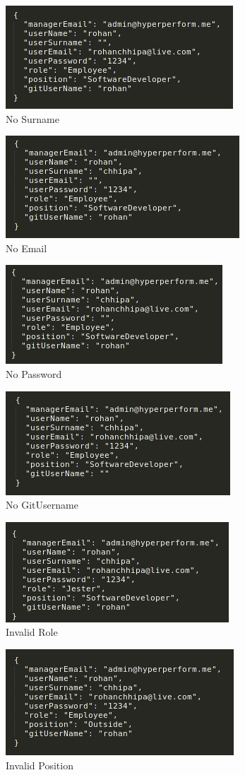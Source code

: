 \documentclass[11pt,a4paper]{article}
\begin{document}
\begin{figure}[H]
	\centering
	\includegraphics[width=.5\linewidth]{../Images/nosurname}
	\caption{No Surname}
\end{figure}

\begin{figure}[H]
	\centering
	\includegraphics[width=.5\linewidth]{../Images/noemail}
	\caption{No Email}
\end{figure}

\begin{figure}[H]
	\centering
	\includegraphics[width=.5\linewidth]{../Images/noPass}
	\caption{No Password}
\end{figure}


\begin{figure}[H]
	\centering
	\includegraphics[width=.5\linewidth]{../Images/nogit}
	\caption{No GitUsername}
\end{figure}

\begin{figure}[H]
	\centering
	\includegraphics[width=.5\linewidth]{../Images/role}
	\caption{Invalid Role}
\end{figure}

\begin{figure}[H]
	\centering
	\includegraphics[width=.5\linewidth]{../Images/position}
	\caption{Invalid Position}
\end{figure}
\end{document}
